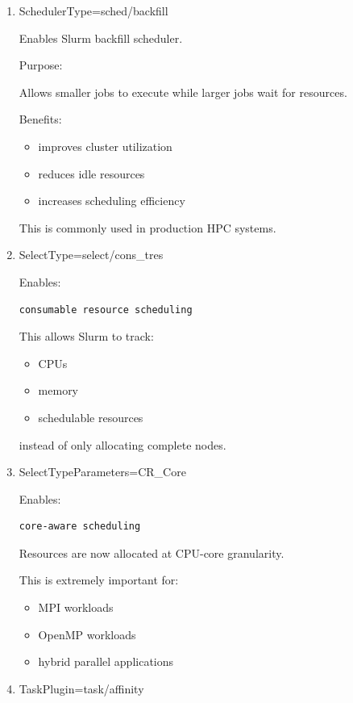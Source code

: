\documentclass[11pt]{article}
\begin{document}
\begin{enumerate}
\item SchedulerType=sched/backfill
\label{sec:orgfd5b887}

Enables Slurm backfill scheduler.

Purpose:

Allows smaller jobs to execute while larger jobs wait for resources.

Benefits:

\begin{itemize}
\item improves cluster utilization
\item reduces idle resources
\item increases scheduling efficiency
\end{itemize}

This is commonly used in production HPC systems.
\item SelectType=select/cons\_tres
\label{sec:org9b3e120}

Enables:

\begin{verbatim}
consumable resource scheduling
\end{verbatim}

This allows Slurm to track:

\begin{itemize}
\item CPUs
\item memory
\item schedulable resources
\end{itemize}

instead of only allocating complete nodes.
\item SelectTypeParameters=CR\_Core
\label{sec:org5f256ee}

Enables:

\begin{verbatim}
core-aware scheduling
\end{verbatim}

Resources are now allocated at CPU-core granularity.

This is extremely important for:

\begin{itemize}
\item MPI workloads
\item OpenMP workloads
\item hybrid parallel applications
\end{itemize}
\item TaskPlugin=task/affinity
\label{sec:orgf5bae6d}


\end{enumerate}
\end{document}
